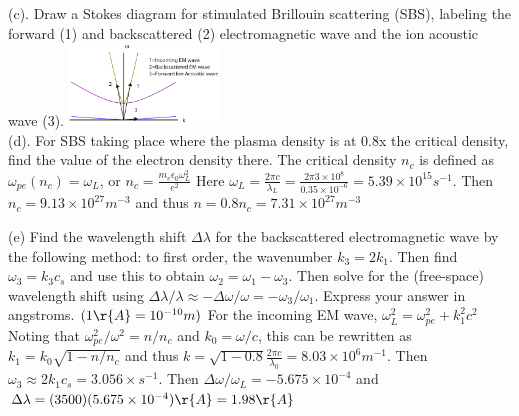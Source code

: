 \documentclass[10pt]{extarticle}
\begin{document}
\begin{multicols}{3}
(c). Draw a Stokes diagram for stimulated Brillouin scattering (SBS), labeling the forward (1) and backscattered (2) electromagnetic wave and the ion acoustic wave (3).
\includegraphics[width=4cm]{images/SBS_MT2.png}\\

(d). For SBS taking place where the plasma density is at 0.8x the critical density, find the value of the electron density there.
The critical density $n_{c}$ is defined as $\omega_{pe}(n_{c}) = \omega_{L}$, or $n_{c} = \frac{m_{e}\epsilon_{0}\omega_{L}^{2}}{e^{2}}$
Here $\omega_{L} = \frac{2\pi c}{\lambda_{L}} = \frac{2\pi 3\times10^{8}}{0.35\times 10^{-6}} = 5.39\times 10^{15}s^{-1}$. Then $n_{c} = 9.13 \times 10^{27} m^{-3}$ and thus $n = 0.8n_{c} = 7.31\times 10^{27} m^{-3}$

(e) Find the wavelength shift $\Delta \lambda$ for the backscattered electromagnetic wave by the following method: to first order, the wavenumber $k_{3} = 2k_{1}$.  Then find $\omega_{3} = k_{3}c_{s}$ and use this to obtain $\omega_{2} = \omega_{1} - \omega_{3}$. Then solve for the (free-space) wavelength shift using $\Delta \lambda / \lambda \approx - \Delta \omega / \omega = -\omega_{3} / \omega_{1}$.  Express your answer in angstroms. $(1\r{A} = 10^{-10}m)$
For the incoming EM wave, $\omega_{L}^{2} = \omega_{pe}^{2} + k_{1}^{2}c^{2}$
Noting that $\omega_{pe}^{2}/\omega^{2} = n/n_{c	}$ and $k_{0} = \omega/c$, this can be rewritten as $k_{1} = k_{0}\sqrt{1-n/n_{c}}$ and thus $k = \sqrt{1-0.8} \frac{2\pi c}{\lambda_{0}} = 8.03 \times 10^{6} m^{-1}$.  Then $\omega_{3} \approx 2k_{1}c_{s} = 3.056\times s^{-1}$.  Then $\Delta\omega / \omega_{L} = -5.675\times 10^{-4}$ and $\Delta\lambda = (3500)(5.675\times 10^{-4}) \r{A} = 1.98 \r{A}$

\end{multicols}
 
\end{document}
